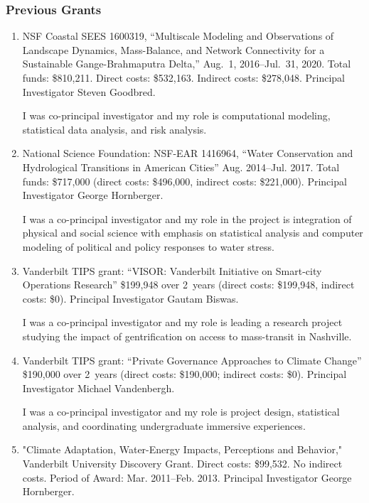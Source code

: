 \subsubsection{Previous Grants}
\begin{enumerate}
    \item NSF Coastal SEES 1600319,
    ``Multiscale Modeling and Observations of Landscape Dynamics, Mass-Balance, and Network Connectivity for a Sustainable Gange-Brahmaputra Delta,''
    Aug.~1, 2016--Jul.~31, 2020.
    Total funds: \$810,211. Direct costs: \$532,163. Indirect costs: \$278,048.
    Principal Investigator Steven Goodbred.
\begin{credit}
I was co-principal investigator and my role is computational modeling, statistical data analysis, and risk analysis.
\end{credit}
    \item National Science Foundation: NSF-EAR 1416964,
    ``Water Conservation and Hydrological Transitions in American Cities''
    Aug. 2014--Jul. 2017.
    Total funds: \$717,000 (direct costs: \$496,000, indirect costs: \$221,000).
    Principal Investigator George Hornberger.
\begin{credit}
I was a co-principal investigator and my role in the project is integration of physical and social science with emphasis on statistical analysis and
computer modeling of political and policy responses to water stress.
\end{credit}
    \item Vanderbilt TIPS grant: ``VISOR: Vanderbilt Initiative on Smart-city Operations Research'' \$199,948 over 2~years (direct costs: \$199,948, indirect costs: \$0). Principal Investigator Gautam Biswas.
\begin{credit}
I was a co-principal investigator and my role is leading a research project studying the impact of gentrification on access to mass-transit in Nashville.
\end{credit}
    \item Vanderbilt TIPS grant: ``Private Governance Approaches to Climate Change'' \$190,000 over 2~years (direct costs: \$190,000; indirect costs: \$0). Principal Investigator Michael Vandenbergh.
\begin{credit}
I was a co-principal investigator and my role is project design, statistical analysis, and coordinating undergraduate immersive experiences.
\end{credit}
	\item "Climate Adaptation, Water-Energy Impacts, Perceptions and Behavior," Vanderbilt University Discovery Grant. Direct costs: \$99,532. No indirect costs. Period of Award: Mar. 2011--Feb. 2013. Principal Investigator George Hornberger.

\end{enumerate}

